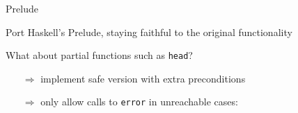 \documentclass[aspectratio=169]{beamer}
\newcommand\hs[1]{\texttt{#1}}
\renewcommand\alert[1]{\textcolor{mLightBrown}{#1}}
\begin{document}
\begin{frame}[fragile]{Prelude}

Port Haskell's Prelude, staying faithful to the original functionality

What about \alert{partial} functions such as \hs{head}?
\pause
\begin{itemize}
\item[$\Rightarrow$] implement safe version with extra preconditions
\item[$\Rightarrow$] only allow calls to \hs{error} in unreachable cases:
\end{itemize}

\begin{minipage}{.59\textwidth}%
\begin{code}%
\>[0]\AgdaSpace{}%
\AgdaSymbol{:}\AgdaSpace{}%
\AgdaSpace{}%
\AgdaSpace{}%
\AgdaSymbol{:}\AgdaSpace{}%
\AgdaSymbol{)}\AgdaSpace{}%
\AgdaSpace{}%
\AgdaSpace{}%
\AgdaSpace{}%
\<%
\\
\>[0]\AgdaSpace{}%
\AgdaSymbol{()}\<%
\\
%
\\[\AgdaEmptyExtraSkip]%
\>[0]\AgdaSpace{}%
\AgdaSymbol{:}\AgdaSpace{}%
\AgdaSymbol{(}\AgdaSpace{}%
\AgdaSymbol{:}\AgdaSpace{}%
\AgdaSpace{}%
\AgdaSymbol{)}\AgdaSpace{}%
\AgdaSpace{}%
\AgdaBound{\AgdaUnderscore{}}\AgdaSpace{}%
\AgdaSymbol{:}\AgdaSpace{}%
\AgdaSpace{}%
\AgdaSymbol{\}}\AgdaSpace{}%
\AgdaSpace{}%
\<%
\\
\>[0]\AgdaSpace{}%
\AgdaSymbol{(}\AgdaSpace{}%
\AgdaSpace{}%
\AgdaSymbol{\AgdaUnderscore{})}%
\>[14]\AgdaSymbol{=}\AgdaSpace{}%
\<%
\\
\>[0]\AgdaSpace{}%
\AgdaInductiveConstructor{[]}\AgdaSpace{}%
\AgdaSymbol{\{}\AgdaSymbol{\}}%
\>[14]\AgdaSymbol{=}\AgdaSpace{}%
\AgdaSpace{}%
\AgdaSpace{}%
\<%
\\
\>[0][@{}l@{\AgdaIndent{0}}]%
\>[2]%
\>[679I]\AgdaSpace{}%
\AgdaSpace{}%
\AgdaSymbol{:}\AgdaSpace{}%
\<%
\\

\end{code}
\end{minipage}
\end{frame}
\end{document}
